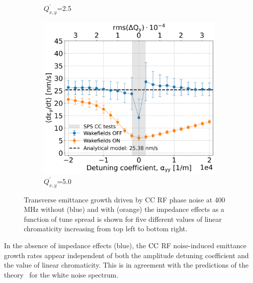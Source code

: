 \begin{figure}[htp]
\begin{subfigure}{.45\textwidth}
        \caption{$Q^\prime_{x,y}$=2.5}
        \label{fig:study_6_chroma_scan_Qpxy25e-1}
    \end{subfigure}
    \begin{subfigure}{.45\textwidth}
        \centering
        \includegraphics[width=.95\linewidth]{images/Ch7/Qpx5.png}  
        \caption{$Q^\prime_{x,y}$=5.0}
        \label{fig:study_6_chroma_scan_Qpxy5}
    \end{subfigure}
    \caption{Transverse emittance growth driven by CC RF phase noise at 400\,MHz without (blue) and with (orange) the impedance effects as a function of tune spread is shown for five different values of linear chromaticity increasing from top left to bottom right.}
    \label{fig:study_6_chroma_scan}
\end{figure}

In the absence of impedance effects (blue), the ${\mathrm{CC}}$ RF noise-induced emittance growth rates appear independent of both the amplitude detuning coefficient and the value of linear chromaticity. This is in agreement with the predictions of the theory~\cite{PhysRevSTAB.18.101001} for the white noise spectrum.

